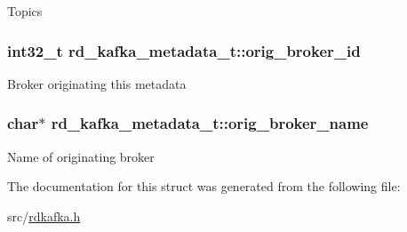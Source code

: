 \label{structrd__kafka__metadata__t_aaf7472220f7c197fb7cd4a73a40ba1b8}
Topics \hypertarget{structrd__kafka__metadata__t_a5ad3f68559288a9d95698bb830d7b5ed}{
\subsubsection[{orig\_\-broker\_\-id}]{\setlength{\rightskip}{0pt plus 5cm}int32\_\-t {\bf rd\_\-kafka\_\-metadata\_\-t::orig\_\-broker\_\-id}}}
\label{structrd__kafka__metadata__t_a5ad3f68559288a9d95698bb830d7b5ed}
Broker originating this metadata \hypertarget{structrd__kafka__metadata__t_a6d94b09d2634a23e3ffa3c0bb5b9f5e4}{
\subsubsection[{orig\_\-broker\_\-name}]{\setlength{\rightskip}{0pt plus 5cm}char$\ast$ {\bf rd\_\-kafka\_\-metadata\_\-t::orig\_\-broker\_\-name}}}
\label{structrd__kafka__metadata__t_a6d94b09d2634a23e3ffa3c0bb5b9f5e4}
Name of originating broker 

The documentation for this struct was generated from the following file:\begin{DoxyCompactItemize}
\item 
src/\hyperlink{rdkafka_8h}{rdkafka.h}\end{DoxyCompactItemize}
